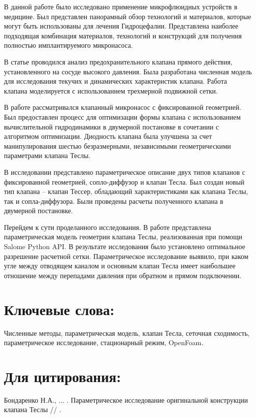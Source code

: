 \documentclass[10pt,a4paper]{book}
\begin{document}
        В данной работе \cite{article} было исследовано применение микрофлюидных устройств в медицине. Был представлен панорамный обзор технологий и материалов, которые могут быть использованы для лечения Гидроцефалии. Представлена наиболее подходящая комбинация материалов, технологий и конструкций для получения полностью имплантируемого микронасоса. 
        
        В статье \cite{SONG2014407} проводился анализ предохранительного клапана прямого действия, установленного на сосуде высокого давления. Была разработана численная модель для исследования текучих и динамических характеристик клапана. Работа клапана моделируется с использованием трехмерной подвижной сетки.
        
        В работе \cite{OptimizationOfTheFixed-GeometryValve} рассматривался клапанный микронасос с фиксированной геометрией. Был предоставлен процесс для оптимизации формы клапана с использованием вычислительной гидродинамики в двумерной постановке в сочетании с алгоритмом оптимизации. Диодность клапана была улучшена за счет манипулирования шестью безразмерными, независимыми геометрическими параметрами клапана Теслы.
        
        В исследовании \cite{inproceedings} представлено параметрическое описание двух типов клапанов с фиксированной геометрией, сопло-диффузор и клапан Тесла. Был создан новый тип клапана -- клапан Тессер, обладающий характеристиками как клапана Теслы, так и сопла-диффузора. Были проведены расчеты полученного клапана в двумерной постановке. 
        
        Перейдем к сути проделанного исследования. В работе представлена параметрическая модель геометрии клапана Теслы, реализованная при помощи Salome Python API. В результате исследования было установлено оптимальное разрешение расчетной сетки. Параметрическое исследование выявило, при каком угле между отводящем каналом и основным клапан Тесла имеет наибольшее отношение между перепадами давления при обратном и прямом подключении.   
                       
        \section*{Ключевые слова:}
        Численные методы, параметрическая модель, клапан Тесла, сеточная сходимость, параметрическое исследование, стационарный режим, OpenFoam.
        
        \section*{Для цитирования:}
        Бондаренко Н.А., ... . Параметрическое исследование оригинальной конструкции клапана Теслы // .
           
\end{document}

